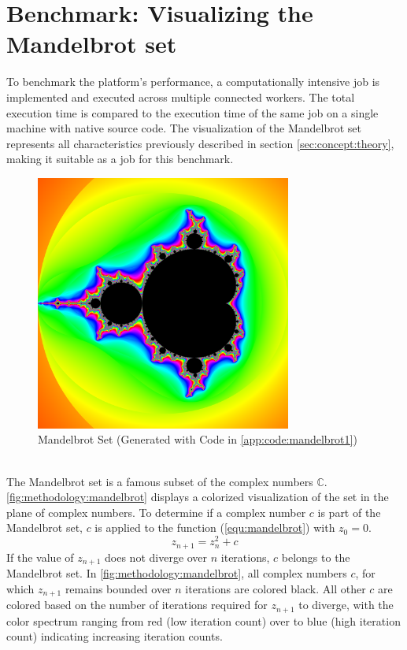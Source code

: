 \section{Benchmark: Visualizing the Mandelbrot set}
\label{sec:methodology:benchmark}
To benchmark the platform's performance, a computationally intensive job is implemented and executed across multiple connected workers. The total execution time is compared to the execution time of the same job on a single machine with native source code. The visualization of the Mandelbrot set represents all characteristics previously described in section \ref{sec:concept:theory}, making it suitable as a job for this benchmark.
\begin{figure}[htbp]
  \centering
  \includegraphics[width=0.75\textwidth]{gfx/figures/mandelbrot.png}
  \caption{Mandelbrot Set (Generated with Code in \autoref{app:code:mandelbrot1})}
  \label{fig:methodology:mandelbrot}
\end{figure}
~\\
The Mandelbrot set is a famous subset of the complex numbers $\mathbb{C}$. \autoref{fig:methodology:mandelbrot} displays a colorized visualization of the set in the plane of complex numbers. To determine if a complex number $c$ is part of the Mandelbrot set, $c$ is applied to the function (\ref{equ:mandelbrot}) with $z_{0}=0$.
\begin{equation}
  z_{n+1} = z_{n}^2 + c
  \label{equ:mandelbrot}
\end{equation}
If the value of $z_{n+1}$ does not diverge over $n$ iterations, $c$ belongs to the Mandelbrot set. In \autoref{fig:methodology:mandelbrot}, all complex numbers $c$, for which $z_{n+1}$ remains bounded over $n$ iterations are colored black. All other $c$ are colored based on the number of iterations required for $z_{n+1}$ to diverge, with the color spectrum ranging from red (low iteration count) over to blue (high iteration count) indicating increasing iteration counts.


